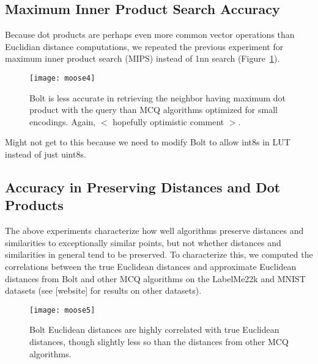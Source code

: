 
\subsection{Maximum Inner Product Search Accuracy}

Because dot products are perhaps even more common vector operations than Euclidian distance computations, we repeated the previous experiment for maximum inner product search (MIPS) instead of 1nn search (Figure~\ref{fig:mips_acc}).

\begin{figure}[h]
\begin{center}
\label{fig:mips_acc}
\texttt{[image: moose4]}
\vspace*{-1mm}
\caption{Bolt is less accurate in retrieving the neighbor having maximum dot product with the query than MCQ algorithms optimized for small encodings. Again, $<$ hopefully optimistic comment $>$.}
\end{center}
\end{figure}

Might not get to this because we need to modify Bolt to allow int8s in LUT instead of just uint8s.

\subsection{Accuracy in Preserving Distances and Dot Products}

The above experiments characterize how well algorithms preserve distances and similarities to exceptionally similar points, but not whether distances and similarities in general tend to be preserved. To characterize this, we computed the correlations between the true Euclidean distances and approximate Euclidean distances from Bolt and other MCQ algorithms on the LabelMe22k and MNIST datasets (see [website] for results on other datasets).

\begin{figure}[h]
\begin{center}
\label{fig:corr_acc}
\texttt{[image: moose5]}
\vspace*{-1mm}
\caption{Bolt Euclidean distances are highly correlated with true Euclidean distances, though slightly less so than the distances from other MCQ algorithms.}
\end{center}
\end{figure}

